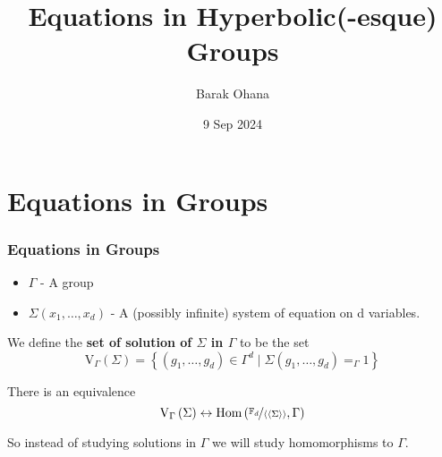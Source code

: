 \documentclass{beamer}[10]
\title{Equations in Hyperbolic(-esque) Groups}
\author{Barak Ohana}
\institute{The Hebrew University of Jerusalem}
\date{9 Sep 2024}
\newcommand{\sol}{\text{V}_{\Gamma}}
\renewcommand{\hom}{\text{Hom}}
\begin{document}
\begin{frame}\titlepage \vspace{-0.5cm}\end{frame}


\section{Equations in Groups}

\begin{frame}
    \frametitle{Equations in Groups}
    \pause
    \begin{itemize}
        \item $\Gamma$ - A group\pause
        \item $\Sigma\left(x_{1},\ldots,x_{d}\right)$ - A (possibly infinite) system of equation on d variables. \pause
    \end{itemize}

   
    We define the \textbf{set of solution of $\Sigma$ in $\Gamma$} to be the set
    \begin{equation*}
        \sol\left(\Sigma\right)=\left\{ \left(g_{1},\ldots,g_{d}\right)\in\Gamma^{d}\mid\Sigma\left(g_{1},\ldots,g_{d}\right)=_{\Gamma}1\right\} 
    \end{equation*}

            \pause

    There is an equivalence
    \begin{equation*}
        \sol\rb{\Sigma} \leftrightarrow \hom\rb{\nicefrac{\ff_d}{\ab{\ab{\Sigma}}}, \Gamma}
    \end{equation*}

    \pause

    So instead of studying solutions in $\Gamma$ we will study homomorphisms to $\Gamma$.

\end{frame}
\end{document}
